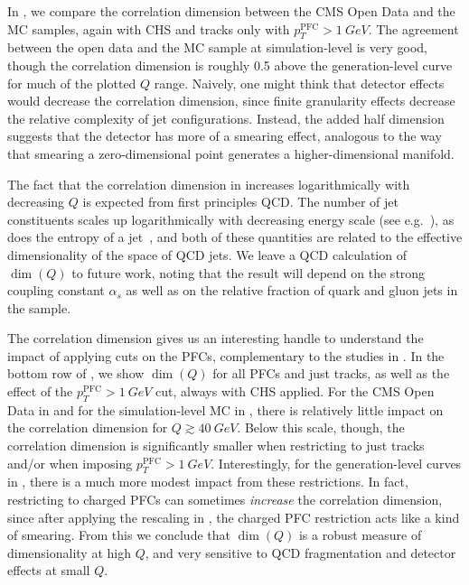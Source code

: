 \documentclass[aps,prd,twocolumn,preprintnumbers,nofootinbib,longbibliography,floatfix,superscriptaddress]{revtex4-1}
\begin{document}
In , we compare the correlation dimension between the CMS Open Data and the MC samples, again with CHS and tracks only with $p_T^\text{PFC} > \SI{1}{GeV}$.
%
The agreement between the open data and the MC sample at simulation-level is very good, though the correlation dimension is roughly 0.5 above the generation-level curve for much of the plotted $Q$ range.
%
Naively, one might think that detector effects would decrease the correlation dimension, since finite granularity effects decrease the relative complexity of jet configurations.
%
Instead, the added half dimension suggests that the detector has more of a smearing effect, analogous to the way that smearing a zero-dimensional point generates a higher-dimensional manifold.


The fact that the correlation dimension in  increases logarithmically with decreasing $Q$ is expected from first principles QCD.
%
The number of jet constituents scales up logarithmically with decreasing energy scale (see e.g.~\cite{Bolzoni:2012ii,Bolzoni:2013rsa}), as does the entropy of a jet~\cite{Neill:2018uqw}, and both of these quantities are related to the effective dimensionality of the space of QCD jets.
%
We leave a QCD calculation of $\dim(Q)$ to future work, noting that the result will depend on the strong coupling constant $\alpha_s$ as well as on the relative fraction of quark and gluon jets in the sample.


The correlation dimension gives us an interesting handle to understand the impact of applying cuts on the PFCs, complementary to the studies in .
%
In the bottom row of , we show $\dim(Q)$ for all PFCs and just tracks, as well as the effect of the $p_T^\text{PFC} > \SI{1}{GeV}$ cut, always with CHS applied.
%
For the CMS Open Data in  and for the simulation-level MC in , there is relatively little impact on the correlation dimension for $Q \gtrsim \SI{40}{GeV}$.
%
Below this scale, though, the correlation dimension is significantly smaller when restricting to just tracks and/or when imposing $p_T^\text{PFC} > \SI{1}{GeV}$.
%
Interestingly, for the generation-level curves in , there is a much more modest impact from these restrictions.
%
In fact, restricting to charged PFCs can sometimes \emph{increase} the correlation dimension, since after applying the rescaling in , the charged PFC restriction acts like a kind of smearing.
%
From this we conclude that $\dim(Q)$ is a robust measure of dimensionality at high $Q$, and very sensitive to QCD fragmentation and detector effects at small $Q$.
\end{document}
